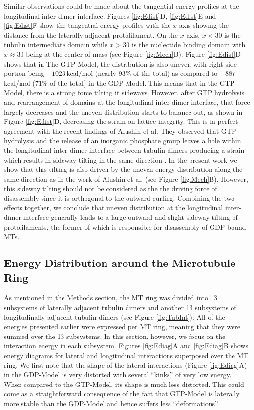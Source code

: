 \documentclass[11pt]{report}
\begin{document}
Similar observations could be made about the tangential energy profiles at the longitudinal inter-dimer interface.
Figures \ref{fig:Edist}D, \ref{fig:Edist}E and \ref{fig:Edist}F show the tangential
energy profiles with the $x$-axis showing the 
distance from the laterally adjacent protofilament. On the $x$-axis, $x<30$ 
is the tubulin intermediate domain
while $x>30$ is the nucleotide binding
domain with $x\approx30$ being at the center of mass (see Figure \ref{fig:Mech}B). Figure \ref{fig:Edist}D shows that
in The GTP-Model, the distribution is
also uneven with right-side portion being $-1023$\,kcal/mol (nearly 93\% of the total) as compared to $-887$\,kcal/mol
(71\% of the total) in the GDP-Model. This means that in the GTP-Model, there is a strong force tilting it sideways. However, after
GTP hydrolysis and rearrangement of domains at
the longitudinal inter-dimer interface, that force largely decreases and the uneven distribution starts to balance out,
as shown in Figure \ref{fig:Edist}D,
decreasing the strain on lattice integrity. 
This is in perfect agreement with the recent findings of
Alushin et al. \cite{Alushin2014} They observed that
GTP hydrolysis and the release of an inorganic
phosphate group
leaves a hole within the longitudinal inter-dimer interface between tubulin dimers producing a strain which results in sideway tilting in the same direction
\cite{Mitchison2014}. In the present work we
show that this tilting is also driven by the uneven energy distribution along
the same direction as in the work of 
Alushin et al. \cite{Alushin2014} (see Figure \ref{fig:Mech}B). However, this sideway tilting should not be considered as the the driving force of disassembly since it is orthogonal to the outward curling. Combining the two effects together, we conclude that uneven distribution at the longitudinal inter-dimer interface generally leads to a large outward and slight sideway tilting of 
protofilaments, the former of which is
responsible for disassembly of GDP-bound MTs.  

\subsection{Energy Distribution around the Microtubule Ring}

As mentioned in the Methods section,
the MT ring was divided into 13 subsystems
of laterally adjacent tubulin dimers and another 13 subsystems
of longitudinally adjacent tubulin dimers
(see Figure \ref{fig:TubInt}). All of the 
energies presented earlier were expressed per MT ring, meaning that they were summed over the 13 subsystems. In this section,
however, we focus on the interaction energy in each 
subsystem. Figures \ref{fig:Ediag}A and \ref{fig:Ediag}B shows energy diagrams 
for lateral and longitudinal interactions superposed
over the MT ring. We first note that 
the shape of the lateral interactions 
(Figure \ref{fig:Ediag}A) in the GDP-Model
is very distorted with several ``kinks'' of very low 
energy. When compared to the GTP-Model, its shape is much
less distorted. This could come as a straightforward consequence of
the fact that GTP-Model is laterally more stable 
than the GDP-Model and hence suffers less ``deformations''.
\end{document}
